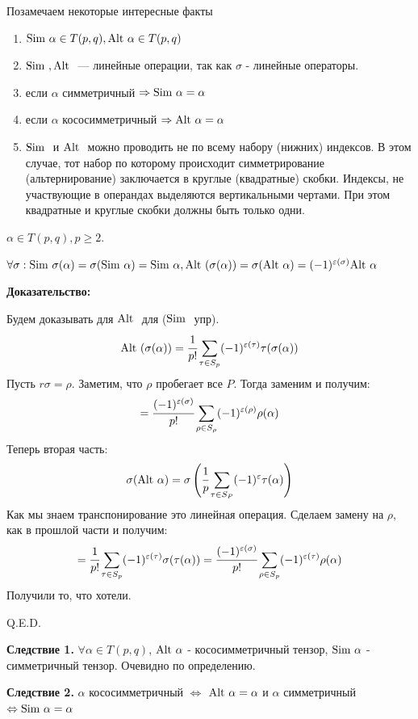 Позамечаем некоторые интересные факты 
\begin{enumerate}
    \item $\text{Sim } \alpha \in T(p,q), \text{Alt } \alpha \in T(p,q) $ 
    \item $\text{Sim }, \text{Alt }$ --- линейные операции, так как $\sigma$ - линейные операторы.
    \item если $\alpha$ симметричный $\Rightarrow \text{Sim } \alpha = \alpha$
    \item  если $\alpha$ кососимметричный $\Rightarrow \text{Alt } \alpha = \alpha$
    \item $\text{Sim }$ и $\text{Alt }$ можно проводить не по всему набору (нижних) индексов. В этом случае, тот набор по которому происходит симметрирование (альтернирование) заключается в круглые (квадратные) скобки. Индексы, не участвующие в операндах выделяются вертикальными чертами. При этом квадратные и круглые скобки должны быть только одни.

\end{enumerate}


$\alpha \in T(p,q), p \geq 2.$ 

$\forall \sigma: \text{Sim } \sigma(\alpha) = \sigma(\text{Sim } \alpha) = \text{Sim } \alpha, \text{Alt }(\sigma(\alpha)) = \sigma(\text{Alt }\alpha) = (-1)^{\varepsilon(\sigma)}\text{Alt } \alpha$

\textbf{Доказательство:}

Будем доказывать для $\text{Alt }$ для ($\text{Sim }$ упр).
$$\text{Alt } (\sigma(\alpha))=\cfrac{1}{p!}\sum\limits_{\tau\in S_p}(-1)^{\varepsilon(\tau)}\tau(\sigma(\alpha))$$
Пусть $r \sigma = \rho$. Заметим, что $\rho$ пробегает все $P$. Тогда заменим и получим:
$$=  \cfrac{(-1)^{\varepsilon(\sigma)}}{p!}\sum\limits_{\rho \in S_\rho} (-1)^{\varepsilon(\rho)}\rho(\alpha)$$
Теперь вторая часть:
$$\sigma(\text{Alt } \alpha) = \sigma\left(\cfrac{1}{p}\sum_{\tau\in S_P}(-1)^{\varepsilon}\tau(\alpha)\right)$$
Как мы знаем транспонирование это линейная операция. Сделаем замену на $\rho$, как в прошлой части и получим:
$$= \cfrac{1}{p!}\sum\limits_{\tau \in S_p}(-1)^{\varepsilon(\tau)}\sigma(\tau(\alpha)) = \cfrac{(-1)^{\varepsilon(\sigma)}}{p!}\sum\limits_{\rho \in S_p}(-1)^{\varepsilon(\tau)} \rho(\alpha)$$
Получили то, что хотели.

\hfill Q.E.D.

\textbf{Следствие 1.} $\forall \alpha \in T(p,q)$, $\text{Alt } \alpha$ - кососимметричный тензор, $\text{Sim } \alpha$ - симметричный тензор. Очевидно по определению.

\textbf{Следствие 2.} $\alpha$ кососимметричный $\Leftrightarrow$ $\text{Alt } \alpha= \alpha$ и $\alpha$ симметричный $\Leftrightarrow \text{Sim } \alpha = \alpha$

